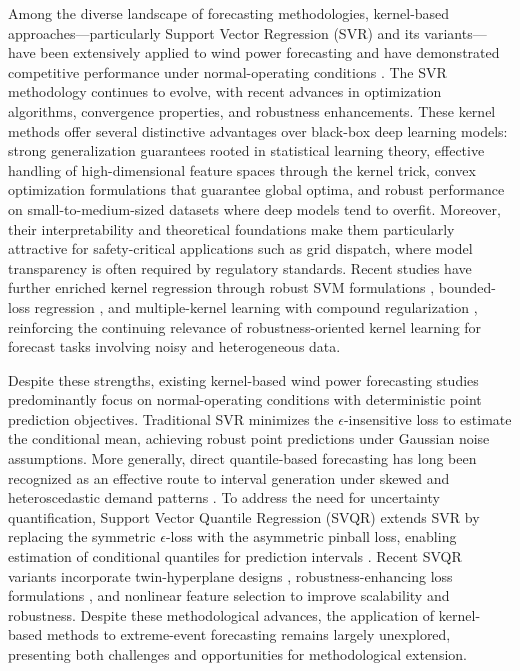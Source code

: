 \documentclass[a4paper]{cas-sc}
\begin{document}
Among the diverse landscape of forecasting methodologies, kernel-based approaches—particularly Support Vector Regression (SVR) and its variants—have been extensively applied to wind power forecasting and have demonstrated competitive performance under normal-operating conditions \citep{wang2019review, li2021cuckoo, luo2024fsvr, yuan2022jellyfish}. The SVR methodology continues to evolve, with recent advances in optimization algorithms, convergence properties, and robustness enhancements. These kernel methods offer several distinctive advantages over black-box deep learning models: strong generalization guarantees rooted in statistical learning theory, effective handling of high-dimensional feature spaces through the kernel trick, convex optimization formulations that guarantee global optima, and robust performance on small-to-medium-sized datasets where deep models tend to overfit. Moreover, their interpretability and theoretical foundations make them particularly attractive for safety-critical applications such as grid dispatch, where model transparency is often required by regulatory standards. Recent studies have further enriched kernel regression through robust SVM formulations \citep{trafalis2006robust}, bounded-loss regression \citep{fu2023bounded}, and multiple-kernel learning with compound regularization \citep{jiang2021rlmkl}, reinforcing the continuing relevance of robustness-oriented kernel learning for forecast tasks involving noisy and heterogeneous data.

Despite these strengths, existing kernel-based wind power forecasting studies predominantly focus on normal-operating conditions with deterministic point prediction objectives. Traditional SVR minimizes the $\epsilon$-insensitive loss to estimate the conditional mean, achieving robust point predictions under Gaussian noise assumptions. More generally, direct quantile-based forecasting has long been recognized as an effective route to interval generation under skewed and heteroscedastic demand patterns \citep{taylor2007ewqr}. To address the need for uncertainty quantification, Support Vector Quantile Regression (SVQR) extends SVR by replacing the symmetric $\epsilon$-loss with the asymmetric pinball loss, enabling estimation of conditional quantiles for prediction intervals \citep{ye2025nfs, tsvqr2023}. Recent SVQR variants incorporate twin-hyperplane designs \citep{tsvqr2023}, robustness-enhancing loss formulations \citep{wang2024ssvqr}, and nonlinear feature selection \citep{ye2025nfs} to improve scalability and robustness. Despite these methodological advances, the application of kernel-based methods to extreme-event forecasting remains largely unexplored, presenting both challenges and opportunities for methodological extension.
\end{document}
